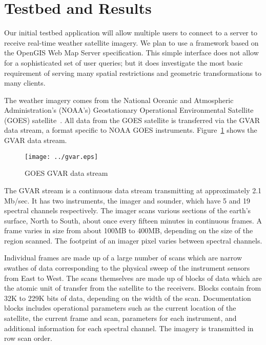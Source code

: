 \documentclass{vldb}
\begin{document}
\section{Testbed and Results}\label{sec:testbed}

Our initial testbed application will allow multiple users to connect
to a server to receive real-time weather satellite imagery.  We plan
to use a framework based on the OpenGIS Web Map Server specification.
This simple interface does not allow for a sophisticated set of user
queries; but it does investigate the most basic requirement of serving
many spatial restrictions and geometric transformations to many
clients.

The weather imagery comes from the National Oceanic and Atmospheric
Administration's (NOAA's) Geostationary Operational Environmental
Satellite (GOES) satellite~\cite{noaa-goes}.  All data from the GOES
satellite is transferred via the GVAR data stream, a format specific
to NOAA GOES instruments.  Figure~\ref{fig:gvar} shows the GVAR data
stream.

\begin{figure}[htbp]
  \begin{center}
    \texttt{[image: ../gvar.eps]}
    \caption{GOES GVAR data stream}
    \label{fig:gvar}
  \end{center}
\end{figure}

The GVAR stream is a continuous data stream transmitting at
approximately 2.1 Mb/sec.  It has two instruments, the imager and
sounder, which have 5 and 19 spectral channels respectively.  The
imager scans various sections of the earth's surface, North to South,
about once every fifteen minutes in continuous frames.  A frame varies
in size from about 100MB to 400MB, depending on the size of the region
scanned.  The footprint of an imager pixel varies between spectral
channels.

Individual frames are made up of a large number of scans which are
narrow swathes of data corresponding to the physical sweep of the
instrument sensors from East to West.  The scans themselves are made
up of blocks of data which are the atomic unit of transfer from the
satellite to the receivers.  Blocks contain from 32K to 229K bits of
data, depending on the width of the scan.  Documentation blocks
includes operational parameters such as the current location of the
satellite, the current frame and scan, parameters for each instrument,
and additional information for each spectral channel.  The imagery is
transmitted in row scan order.
\end{document}

